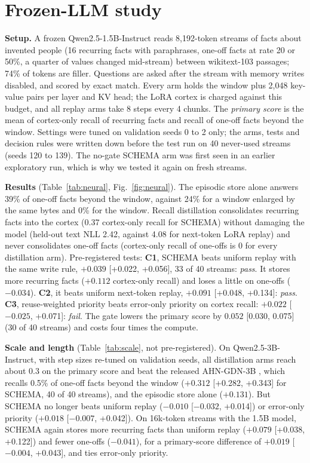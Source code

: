 \documentclass[letterpaper,10pt,twocolumn]{article}
\begin{document}
\section{Frozen-LLM study}
\textbf{Setup.} A frozen Qwen2.5-1.5B-Instruct \cite{qwen} reads 8,192-token streams of facts about invented people (16 recurring facts with paraphrases, one-off facts at rate 20 or 50\%, a quarter of values changed mid-stream) between wikitext-103 passages; 74\% of tokens are filler. Questions are asked after the stream with memory writes disabled, and scored by exact match. Every arm holds the window plus 2,048 key-value pairs per layer and KV head; the LoRA cortex is charged against this budget, and all replay arms take 8 steps every 4 chunks. The \emph{primary score} is the mean of cortex-only recall of recurring facts and recall of one-off facts beyond the window. Settings were tuned on validation seeds 0 to 2 only; the arms, tests and decision rules were written down before the test run on 40 never-used streams (seeds 120 to 139). The no-gate SCHEMA arm was first seen in an earlier exploratory run, which is why we tested it again on fresh streams.

\textbf{Results} (Table~\ref{tab:neural}, Fig.~\ref{fig:neural}). The episodic store alone answers 39\% of one-off facts beyond the window, against 24\% for a window enlarged by the same bytes and 0\% for the window. Recall distillation consolidates recurring facts into the cortex (0.37 cortex-only recall for SCHEMA) without damaging the model (held-out text NLL 2.42, against 4.08 for next-token LoRA replay) and never consolidates one-off facts (cortex-only recall of one-offs is 0 for every distillation arm). Pre-registered tests: \textbf{C1}, SCHEMA beats uniform replay with the same write rule, $+0.039$ [+0.022, +0.056], 33 of 40 streams: \emph{pass}. It stores more recurring facts ($+0.112$ cortex-only recall) and loses a little on one-offs ($-0.034$). \textbf{C2}, it beats uniform next-token replay, $+0.091$ [+0.048, +0.134]: \emph{pass}. \textbf{C3}, reuse-weighted priority beats error-only priority on cortex recall: $+0.022$ [$-0.025$, +0.071]: \emph{fail}. The gate lowers the primary score by $0.052$ [0.030, 0.075] (30 of 40 streams) and costs four times the compute.

\textbf{Scale and length} (Table~\ref{tab:scale}, not pre-registered). On Qwen2.5-3B-Instruct, with step sizes re-tuned on validation seeds, all distillation arms reach about 0.3 on the primary score and beat the released AHN-GDN-3B \cite{ahn}, which recalls 0.5\% of one-off facts beyond the window ($+0.312$ [+0.282, +0.343] for SCHEMA, 40 of 40 streams), and the episodic store alone ($+0.131$). But SCHEMA no longer beats uniform replay ($-0.010$ [$-0.032$, +0.014]) or error-only priority ($+0.018$ [$-0.007$, +0.042]). On 16k-token streams with the 1.5B model, SCHEMA again stores more recurring facts than uniform replay ($+0.079$ [+0.038, +0.122]) and fewer one-offs ($-0.041$), for a primary-score difference of $+0.019$ [$-0.004$, +0.043], and ties error-only priority.
\end{document}
